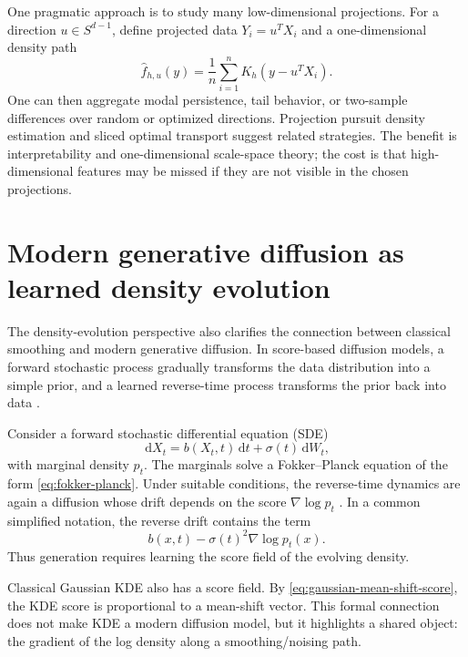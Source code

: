 \documentclass[preprint]{imsart}
\theoremstyle{plain}
\theoremstyle{definition}
\newcommand{\dd}{\,\mathrm{d}}
\newcommand{\fhat}{\widehat f}
\begin{document}
One pragmatic approach is to study many low-dimensional projections. For a direction $u\in S^{d-1}$, define projected data $Y_i=u^T X_i$ and a one-dimensional density path
\[
  \fhat_{h,u}(y)=\frac1n\sum_{i=1}^n K_h(y-u^T X_i).
\]
One can then aggregate modal persistence, tail behavior, or two-sample differences over random or optimized directions. Projection pursuit density estimation and sliced optimal transport suggest related strategies. The benefit is interpretability and one-dimensional scale-space theory; the cost is that high-dimensional features may be missed if they are not visible in the chosen projections.



\section{Modern generative diffusion as learned density evolution}
\label{sec:generative-diffusion}

The density-evolution perspective also clarifies the connection between classical smoothing and modern generative diffusion. In score-based diffusion models, a forward stochastic process gradually transforms the data distribution into a simple prior, and a learned reverse-time process transforms the prior back into data \citep{sohl-dickstein_2015_DeepUnsupervisedLearning,song_2019_GenerativeModelingEstimating,ho_2020_DenoisingDiffusionProbabilistic,song_2020_ScoreBasedGenerativeModeling}.

Consider a forward stochastic differential equation (SDE)
\begin{equation*}
  \dd X_t=b(X_t,t)\dd t+\sigma(t)\dd W_t,
\end{equation*}
with marginal density $p_t$. The marginals solve a Fokker--Planck equation of the form \eqref{eq:fokker-planck}. Under suitable conditions, the reverse-time dynamics are again a diffusion whose drift depends on the score $\nabla\log p_t$ \citep{anderson_1982_ReversetimeDiffusionEquation,song_2020_ScoreBasedGenerativeModeling}. In a common simplified notation, the reverse drift contains the term
\begin{equation*}
  b(x,t)-\sigma(t)^2\nabla\log p_t(x).
\end{equation*}
Thus generation requires learning the score field of the evolving density.

Classical Gaussian KDE also has a score field. By \eqref{eq:gaussian-mean-shift-score}, the KDE score is proportional to a mean-shift vector. This formal connection does not make KDE a modern diffusion model, but it highlights a shared object: the gradient of the log density along a smoothing/noising path.
\end{document}
